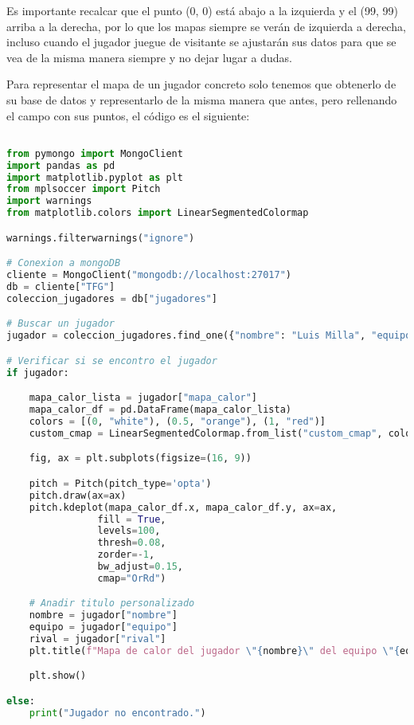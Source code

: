 Es importante recalcar que el punto (0, 0) está abajo a la izquierda y el (99, 99) arriba a la derecha, por lo que los mapas siempre se verán de izquierda a derecha, incluso cuando el jugador juegue de visitante se ajustarán sus datos para que se vea de la misma manera siempre y no dejar lugar a dudas.

Para representar el mapa de un jugador concreto solo tenemos que obtenerlo de su base de datos y representarlo de la misma manera que antes, pero rellenando el campo con sus puntos, el código es el siguiente:

\begin{lstlisting}[language=Python, caption={Mapa de calor de un futbolista}, label={lst:codigo-python}]

from pymongo import MongoClient
import pandas as pd
import matplotlib.pyplot as plt
from mplsoccer import Pitch
import warnings
from matplotlib.colors import LinearSegmentedColormap

warnings.filterwarnings("ignore")

# Conexion a mongoDB
cliente = MongoClient("mongodb://localhost:27017")
db = cliente["TFG"]
coleccion_jugadores = db["jugadores"]

# Buscar un jugador
jugador = coleccion_jugadores.find_one({"nombre": "Luis Milla", "equipo": "Getafe", "rival": "Villareal"})

# Verificar si se encontro el jugador
if jugador:

    mapa_calor_lista = jugador["mapa_calor"]
    mapa_calor_df = pd.DataFrame(mapa_calor_lista)
    colors = [(0, "white"), (0.5, "orange"), (1, "red")]
    custom_cmap = LinearSegmentedColormap.from_list("custom_cmap", colors)

    fig, ax = plt.subplots(figsize=(16, 9))

    pitch = Pitch(pitch_type='opta')
    pitch.draw(ax=ax)
    pitch.kdeplot(mapa_calor_df.x, mapa_calor_df.y, ax=ax,
                fill = True,
                levels=100,
                thresh=0.08,
                zorder=-1,
                bw_adjust=0.15,
                cmap="OrRd")

    # Anadir titulo personalizado
    nombre = jugador["nombre"]
    equipo = jugador["equipo"]
    rival = jugador["rival"]
    plt.title(f"Mapa de calor del jugador \"{nombre}\" del equipo \"{equipo}\", rival \"{rival}\"", fontsize=18)

    plt.show() 

else:
    print("Jugador no encontrado.")

\end{lstlisting}

